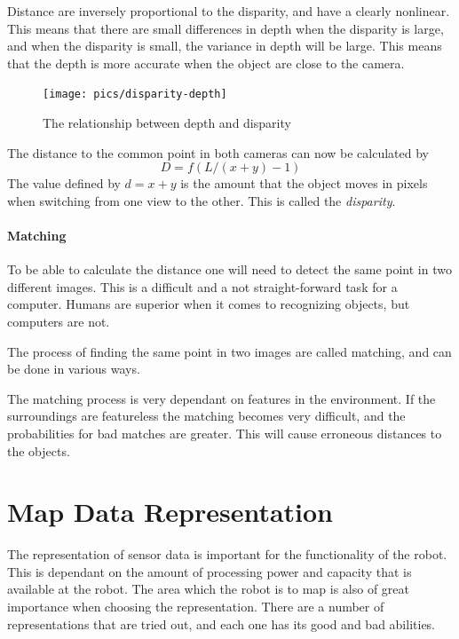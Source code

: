     Distance are inversely proportional to the disparity, and have a clearly nonlinear.
    This means that there are small differences in depth when the disparity is large, and
    when the disparity is small, the variance in depth will be large. This means that the
    depth is more accurate when the object are close to the camera. 
    \begin{figure}[htbp]
        \centering
        \texttt{[image: pics/disparity-depth]}
        \caption{The relationship between depth and disparity}
        \label{fig:chap2-disparity-depth}
    \end{figure}


    

    The distance to the common point in both cameras can now be calculated by 
    \begin{equation}
        D = f (L / (x+y) - 1)
    \end{equation}
    The value defined by $d = x+y$ is the amount that the object moves in pixels when
    switching from one view to the other. This is called the \emph{disparity}.


\paragraph{Matching}
    To be able to calculate the distance one will need to detect the same point in two
    different images. This is a difficult and a not straight-forward task for a computer.
    Humans are superior when it comes to recognizing objects, but computers are not.

    The process of finding the same point in two images are called matching, and can be
    done in various ways. \cite{gonzalez}

    The matching process is very dependant on features in the environment. If the
    surroundings are featureless the matching becomes very difficult, and the
    probabilities for bad matches are greater. This will cause erroneous distances to the
    objects.




   



\section{Map Data Representation}
The representation of sensor data is important for the functionality of the robot. This is
dependant on the amount of processing power and capacity that is available at the robot.
The area which the robot is to map is also of great importance when choosing the
representation. There are a number of representations that are tried out, and each one has its good and
bad abilities. 

